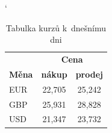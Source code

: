 \documentclass[a4paper, 11pt]{article}
\begin{document}
\begin{table}[ht]
    \catcode` %
    \centering
    \begin{tabular}{|l|c|c|} 
        \hline
        & \multicolumn{2}{c|}{\textbf{Cena}} \\ \cline{2-3}
        \textbf{Měna} & \textbf{nákup} & \textbf{prodej} \\ 
        \hline
        EUR & 22,705 & 25,242 \\
        GBP & 25,931 & 28,828 \\
        USD & 21,347 & 23,732 \\ 
        \hline
    \end{tabular}
    \caption{Tabulka kurzů k~dnešnímu dni}
    \label{tab:currency}
\end{table}

\bigskip
\end{document}
